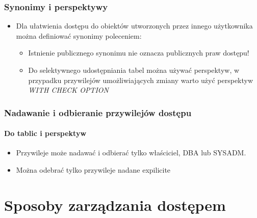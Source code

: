 \documentclass[a4paper,twoside]{article}
\begin{document}
  \section*{Synonimy i perspektywy}
      \begin{itemize}
          \item Dla ułatwienia dostępu do obiektów utworzonych przez innego użytkownika można definiować synonimy poleceniem:
          \begin{itemize}
              \item Istnienie publicznego synonimu nie oznacza publicznych praw dostępu! 
              \item Do selektywnego udostępniania tabel można używać perspektyw, w przypadku przywilejów umożliwiających zmiany warto użyć perspektyw \emph{WITH CHECK OPTION}
          \end{itemize}
      \end{itemize}

  \section*{Nadawanie i odbieranie przywilejów dostępu}
      \subsection*{Do tablic i perspektyw}
      \begin{itemize}
          \item Przywileje może nadawać i odbierać tylko właściciel, DBA lub SYSADM.
          \item Można odebrać tylko przywileje nadane expilicite
      \end{itemize}


  \part*{Sposoby zarządzania dostępem}

\end{document}
